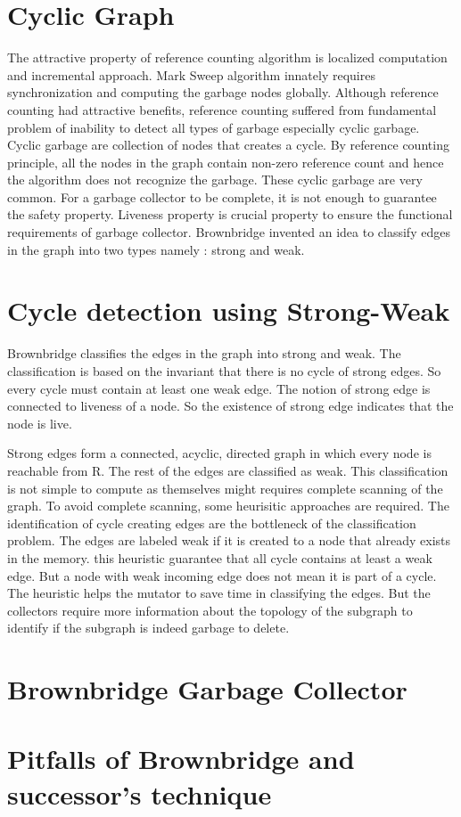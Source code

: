 \section{Cyclic Graph}
The attractive property of reference counting algorithm is localized computation and incremental approach. Mark Sweep algorithm innately requires synchronization and computing the garbage nodes globally. Although reference counting had attractive benefits, reference counting  suffered from fundamental problem of inability to detect all types of garbage especially cyclic garbage. Cyclic garbage are collection of nodes that creates a cycle. By reference counting principle, all the nodes in the graph contain non-zero reference count and hence the algorithm does not recognize the garbage. These cyclic garbage are very common. For a garbage collector to be complete, it is not enough to guarantee the safety property. Liveness property is crucial property to ensure the functional requirements of garbage collector. Brownbridge invented an idea to classify edges in the graph into two types namely : strong and weak. 
\section{Cycle detection using Strong-Weak}
Brownbridge classifies the edges in the graph into strong and weak. The classification is based on the invariant that there is no cycle of strong edges. So every cycle must contain at least one weak edge. The notion of strong edge is connected to liveness of a node. So  the existence of strong edge indicates that the node is live. 

Strong edges form a connected, acyclic, directed graph in which every node is reachable from R. The rest of the edges are classified as weak. This classification is not simple to compute as themselves might requires complete scanning of the graph. To avoid complete scanning, some heurisitic approaches are required. The identification of cycle creating edges are the bottleneck of the classification problem. The edges are  labeled weak if it is created to a node that already exists in the memory. this heuristic guarantee that all cycle contains at least a weak edge. But a node with weak incoming edge does not mean it is part of a cycle. The heuristic helps the mutator to save time in classifying the edges. But the collectors require more information about the topology of the subgraph to identify if the subgraph is indeed garbage to delete.
\section{Brownbridge Garbage Collector}
\section{Pitfalls of Brownbridge and successor's technique}
